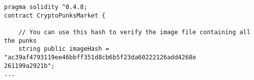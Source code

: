 \begin{lstlisting}[language=Solidity, basicstyle=\scriptsize]
pragma solidity ^0.4.8;
contract CryptoPunksMarket {

    // You can use this hash to verify the image file containing all the punks
    string public imageHash = 
"ac39af4793119ee46bbff351d8cb6b5f23da60222126add4268e
261199a2921b";
...
\end{lstlisting}